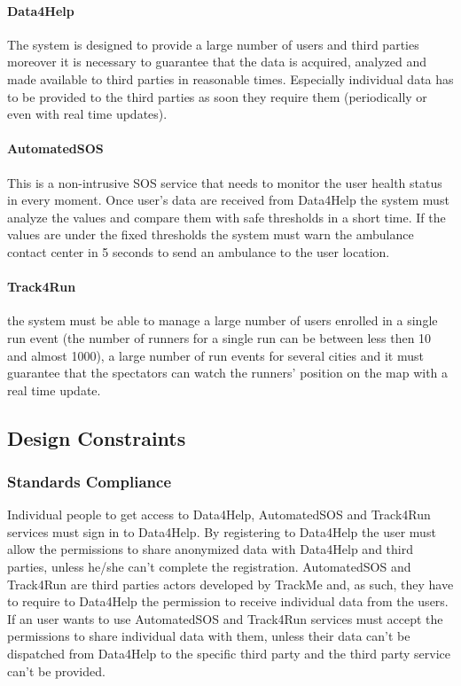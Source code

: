 \documentclass[a4paper]{article}
\begin{document}
    \paragraph{Data4Help} The system is designed to provide a large number of users and third parties moreover it is necessary to guarantee that the data is acquired, analyzed and made available to third parties in reasonable times. Especially individual data has to be provided to the third parties as soon they require them (periodically or even with real time updates).
    
    \paragraph{AutomatedSOS} This is a non-intrusive SOS service that needs to monitor the user health status in every moment. Once user's data are received from Data4Help the system must analyze the values and compare them with safe thresholds in a short time. If the values are under the fixed thresholds the system must warn the ambulance contact center in 5 seconds to send an ambulance to the user location.
    
    \paragraph{Track4Run} the system must be able to manage a large number of users enrolled in a single run event (the number of runners for a single run can be between less then 10 and almost 1000), a large number of run events for several cities and it must guarantee that the spectators can watch the runners' position on the map with a real time update.
    
    
    \subsection{Design Constraints}
    
    \subsubsection{Standards Compliance}
    
    Individual people to get access to Data4Help, AutomatedSOS and Track4Run services must sign in to Data4Help. By registering to Data4Help the user must allow the permissions to share anonymized data with Data4Help and third parties, unless he/she can't complete the registration.
    AutomatedSOS and Track4Run are third parties actors developed by TrackMe and, as such, they have to require to Data4Help the permission to receive individual data from the users.
    If an user wants to use AutomatedSOS and Track4Run services must accept the permissions to share individual data with them, unless their data can't be dispatched from Data4Help to the specific third party and the third party service can't be provided.
    
\end{document}
